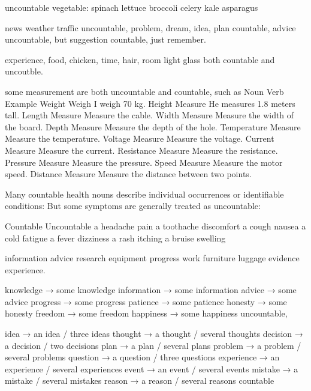 \documentclass[a4paper,11pt,twoside]{book}
\begin{document}
\par uncountable vegetable:
spinach	lettuce	broccoli celery	kale asparagus

\par news weather traffic uncountable, problem, dream, idea, plan countable, advice uncountable, but suggestion countable, just remember.

\par experience, food, chicken, time, hair, room light glass both countable and uncoutble.  

\par some measurement are both uncountable and countable, such as 
Noun	Verb	Example
Weight	Weigh	I weigh 70 kg.
Height	Measure	He measures 1.8 meters tall.
Length	Measure	Measure the cable.
Width	Measure	Measure the width of the board.
Depth	Measure	Measure the depth of the hole.
Temperature	Measure	Measure the temperature.
Voltage	Measure	Measure the voltage.
Current	Measure	Measure the current.
Resistance	Measure	Measure the resistance.
Pressure	Measure	Measure the pressure.
Speed	Measure	Measure the motor speed.
Distance	Measure	Measure the distance between two points.

\par Many countable health nouns describe individual occurrences or identifiable conditions: But some symptoms are generally treated as uncountable:

Countable	Uncountable
a headache	pain
a toothache	discomfort
a cough	nausea
a cold	fatigue
a fever	dizziness
a rash	itching
a bruise	swelling


\par information advice
	research equipment
	progress work
	furniture luggage
	evidence experience. 
	
\par  knowledge → some knowledge
	information → some information
	advice → some advice
	progress → some progress
	patience → some patience
	honesty → some honesty
	freedom → some freedom
	happiness → some happiness uncountable, 
	
\par idea → an idea / three ideas
	thought → a thought / several thoughts
	decision → a decision / two decisions
	plan → a plan / several plans
	problem → a problem / several problems
	question → a question / three questions
	experience → an experience / several experiences
	event → an event / several events
	mistake → a mistake / several mistakes
	reason → a reason / several reasons  countable
	
	
\end{document}
